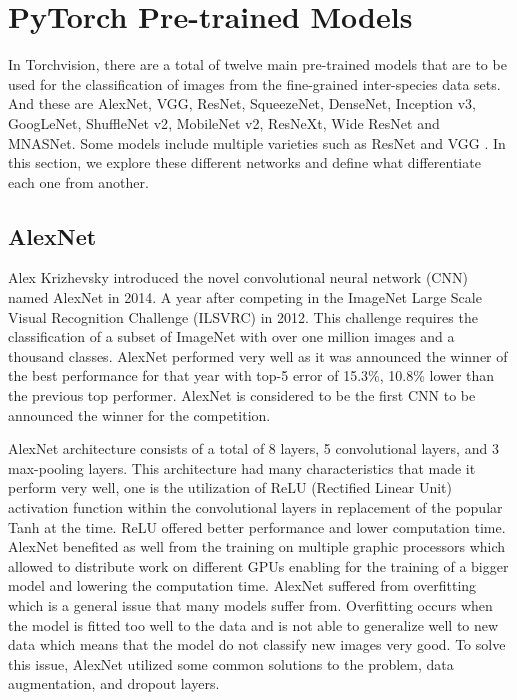\documentclass[conference]{IEEEtran}
\begin{document}
\section{PyTorch Pre-trained Models}
In Torchvision, there are a total of twelve main pre-trained models that are to be used for the classification of images from the fine-grained inter-species data sets. And these are AlexNet\cite{krizhevsky2014one}, VGG\cite{simonyan2014very}, ResNet\cite{he2016deep}, SqueezeNet\cite{iandola2016squeezenet}, DenseNet\cite{huang2017densely}, Inception v3\cite{szegedy2016rethinking}, GoogLeNet\cite{szegedy2015going}, ShuffleNet v2\cite{ma2018shufflenet}, MobileNet v2\cite{sandler2018mobilenetv2}, ResNeXt\cite{xie2017aggregated}, Wide ResNet\cite{zagoruyko2016wide} and MNASNet\cite{tan2019mnasnet}. Some models include multiple varieties such as ResNet and VGG \cite{kabir2021optimal, abdar2021review, kabir2019partial}. In this section, we explore these different networks and define what differentiate each one from another. 


\subsection{AlexNet}
Alex Krizhevsky introduced the novel convolutional neural network (CNN) named AlexNet in 2014. A year after competing in the ImageNet Large Scale Visual Recognition Challenge (ILSVRC)\cite{russakovsky2015imagenet} in 2012. This challenge requires the classification of a subset of ImageNet with over one million images and a thousand classes. AlexNet performed very well as it was announced the winner of the best performance for that year with top-5 error of 15.3\%, 10.8\% lower than the previous top performer. AlexNet is considered to be the first CNN to be announced the winner for the competition.

AlexNet architecture consists of a total of 8 layers, 5 convolutional layers, and 3 max-pooling layers. This architecture had many characteristics that made it perform very well, one is the utilization of ReLU (Rectified Linear Unit)\cite{nair2010rectified} activation function within the convolutional layers in replacement of the popular Tanh at the time. ReLU offered better performance and lower computation time. AlexNet benefited as well from the training on multiple graphic processors which allowed to distribute work on different GPUs enabling for the training of a bigger model and lowering the computation time. AlexNet suffered from overfitting which is a general issue that many models suffer from. Overfitting occurs when the model is fitted too well to the data and is not able to generalize well to new data which means that the model do not classify new images very good. To solve this issue, AlexNet utilized some common solutions to the problem, data augmentation, and dropout layers\cite{srivastava2014dropout}. 
\end{document}
